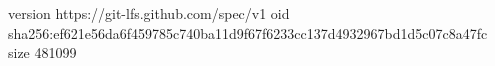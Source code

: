 version https://git-lfs.github.com/spec/v1
oid sha256:ef621e56da6f459785c740ba11d9f67f6233cc137d4932967bd1d5c07c8a47fc
size 481099
